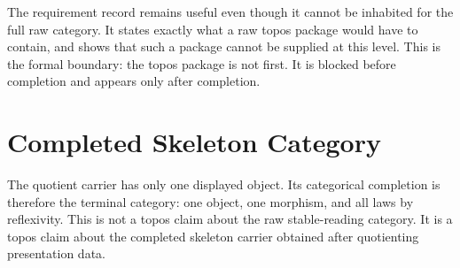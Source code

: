 \documentclass[11pt]{article}
\begin{document}
The requirement record remains useful even though it cannot be inhabited
for the full raw category.  It states exactly what a raw topos package
would have to contain, and
 shows that such a
package cannot be supplied at this level.  This is the formal boundary:
the topos package is not first.  It is blocked before completion and
appears only after completion.

\section{Completed Skeleton Category}

The quotient carrier has only one displayed object.  Its categorical
completion is therefore the terminal category: one object, one morphism,
and all laws by reflexivity.  This is not a topos claim about the raw
stable-reading category.  It is a topos claim about the completed
skeleton carrier obtained after quotienting presentation data.
\end{document}
